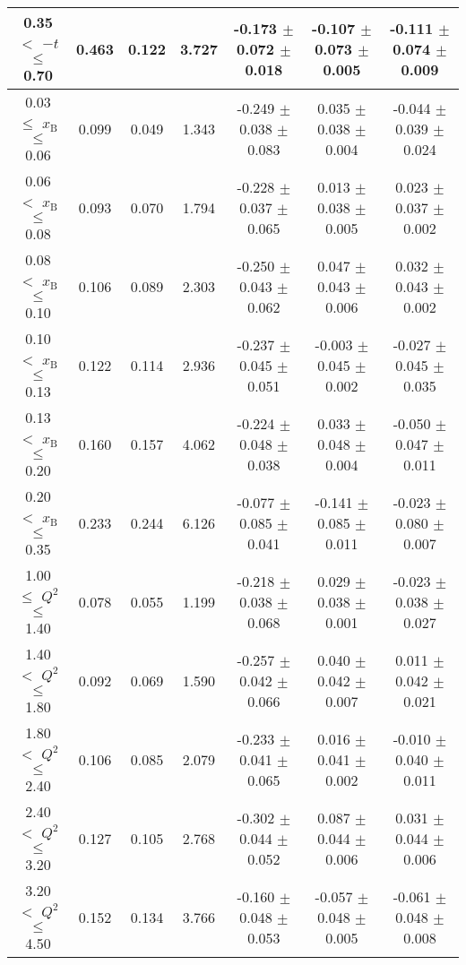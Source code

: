 \begin{table}[width=15cm]
\begin{center}
{\begin{tabular}{|c|c|c|c|c|c|c|}
0.35 $<$ $-t$ $\leqslant$ 0.70 &  0.463 & 0.122 &  3.727 &  -0.173  $\pm$  0.072  $\pm$   0.018 & 
-0.107  $\pm$  0.073   $\pm$  0.005 & -0.111 $\pm$   0.074  $\pm$   0.009\\
\hline
0.03 $\leqslant$ $x_{\textrm{B}}$ $\leqslant$ 0.06 &  0.099 & 0.049 & 1.343 & -0.249  $\pm$  0.038  $\pm$   0.083 &
0.035 $\pm$   0.038  $\pm$   0.004 & -0.044  $\pm$  0.039  $\pm$  0.024 \\ 
0.06 $<$ $x_{\textrm{B}}$ $\leqslant$ 0.08 &  0.093 & 0.070 &  1.794 &  -0.228 $\pm$  0.037  $\pm$   0.065 &
0.013  $\pm$  0.038  $\pm$   0.005 & 0.023 $\pm$   0.037  $\pm$   0.002\\
0.08 $<$ $x_{\textrm{B}}$ $\leqslant$ 0.10 &  0.106 & 0.089 &  2.303 &  -0.250 $\pm$   0.043  $\pm$   0.062 &
0.047 $\pm$   0.043  $\pm$   0.006 & 0.032  $\pm$  0.043  $\pm$   0.002\\
0.10 $<$ $x_{\textrm{B}}$ $\leqslant$ 0.13 &  0.122 &  0.114 &  2.936 &  -0.237 $\pm$   0.045  $\pm$   0.051 &
-0.003  $\pm$  0.045 $\pm$    0.002 & -0.027 $\pm$ 0.045  $\pm$   0.035\\
0.13 $<$ $x_{\textrm{B}}$ $\leqslant$ 0.20 &  0.160 & 0.157 &  4.062 &  -0.224 $\pm$   0.048  $\pm$   0.038 &
0.033  $\pm$  0.048 $\pm$    0.004 & -0.050 $\pm$   0.047  $\pm$   0.011\\
0.20 $<$ $x_{\textrm{B}}$ $\leqslant$ 0.35 &  0.233 & 0.244 &  6.126 &  -0.077  $\pm$  0.085 $\pm$    0.041 &
-0.141  $\pm$  0.085  $\pm$   0.011 & -0.023 $\pm$  0.080 $ \pm$  0.007\\
\hline
1.00 $\leqslant$ $Q^{2}$ $\leqslant$ 1.40 &  0.078 & 0.055  & 1.199  &  -0.218  $\pm$  0.038  $\pm$   0.068 &
0.029 $\pm$   0.038  $\pm$   0.001 & -0.023  $\pm$  0.038  $\pm$   0.027\\
1.40 $<$ $Q^{2}$ $\leqslant$ 1.80 &  0.092 & 0.069 &  1.590  &  -0.257  $\pm$  0.042  $\pm$   0.066 &
0.040 $\pm$  0.042  $\pm$   0.007 & 0.011 $\pm$   0.042  $\pm$   0.021\\
1.80 $<$ $Q^{2}$ $\leqslant$ 2.40 &  0.106 & 0.085 &  2.079  &  -0.233 $\pm$  0.041  $\pm$   0.065 &
0.016 $\pm$   0.041  $\pm$   0.002 & -0.010  $\pm$  0.040  $\pm$   0.011\\
2.40 $<$ $Q^{2}$ $\leqslant$ 3.20 &  0.127 & 0.105  & 2.768  &  -0.302  $\pm$  0.044   $\pm$  0.052 & 
0.087  $\pm$  0.044  $\pm$   0.006 & 0.031  $\pm$  0.044  $\pm$   0.006\\
3.20 $<$ $Q^{2}$ $\leqslant$ 4.50 &  0.152 & 0.134 &  3.766  &  -0.160  $\pm$  0.048  $\pm$   0.053 &
-0.057  $\pm$  0.048  $\pm$   0.005 & -0.061  $\pm$  0.048  $\pm$   0.008 \\

\end{tabular}}
\end{center}
\end{table}
